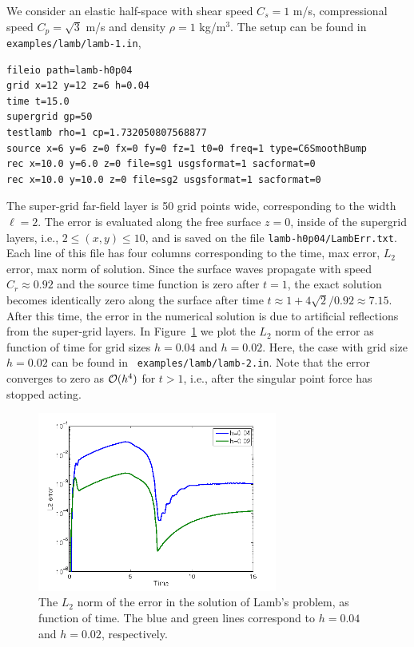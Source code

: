 \documentclass[11pt]{report}
\begin{document}
We consider an elastic half-space with shear speed $C_s=1$ m/s, compressional speed
$C_p=\sqrt{3}$ m/s and density $\rho=1$ kg/m$^3$. The setup can be found in {\tt
  examples/lamb/lamb-1.in},
\begin{verbatim}
fileio path=lamb-h0p04
grid x=12 y=12 z=6 h=0.04
time t=15.0
supergrid gp=50
testlamb rho=1 cp=1.732050807568877
source x=6 y=6 z=0 fx=0 fy=0 fz=1 t0=0 freq=1 type=C6SmoothBump
rec x=10.0 y=6.0 z=0 file=sg1 usgsformat=1 sacformat=0
rec x=10.0 y=10.0 z=0 file=sg2 usgsformat=1 sacformat=0
\end{verbatim}
The super-grid far-field layer is 50 grid points wide, corresponding to the width $\ell=2$.  The
error is evaluated along the free surface $z=0$, inside of the supergrid layers, i.e., $2\leq (x,y) \leq 10$, and is
saved on the file \verb+lamb-h0p04/LambErr.txt+. Each line of this file has four columns
corresponding to the time, max error, $L_2$ error, max norm of solution. Since the surface waves
propagate with speed $C_r\approx 0.92$ and the source time function is zero after $t=1$, the exact
solution becomes identically zero along the surface after time $t\approx 1 + 4\sqrt{2}/0.92 \approx
7.15$. After this time, the error in the numerical solution is due to artificial reflections from
the super-grid layers. In Figure~\ref{fig:lamb-err} we plot the $L_2$ norm of the error as function of time for
grid sizes $h=0.04$ and $h=0.02$. Here, the case with grid size $h=0.02$ can be found in {\tt
  examples/lamb/lamb-2.in}. Note that the error converges to zero as ${\cal O}(h^4)$ for $t>1$,
i.e., after the singular point force has stopped acting.
\begin{figure}[ht]
\begin{center}
\includegraphics[width=0.7\textwidth]{figures/lamb-err.png}
\caption{The $L_2$ norm of the error in the solution of Lamb's problem, as function of time. The blue
and green lines correspond to $h=0.04$ and $h=0.02$, respectively.}
\label{fig:lamb-err}
\end{center}
\end{figure}
\end{document}
